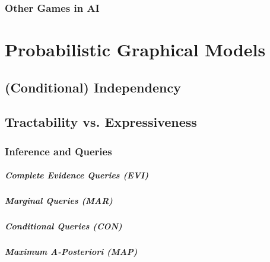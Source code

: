 		\subsection{Other Games in AI} %

\chapter{Probabilistic Graphical Models} %

	\section{(Conditional) Independency} %

	\section{Tractability vs. Expressiveness} %

		\subsection{Inference and Queries} %

			\paragraph{Complete Evidence Queries (EVI)} %

			\paragraph{Marginal Queries (MAR)} %

			\paragraph{Conditional Queries (CON)} %

			\paragraph{Maximum A-Posteriori (MAP)} %

